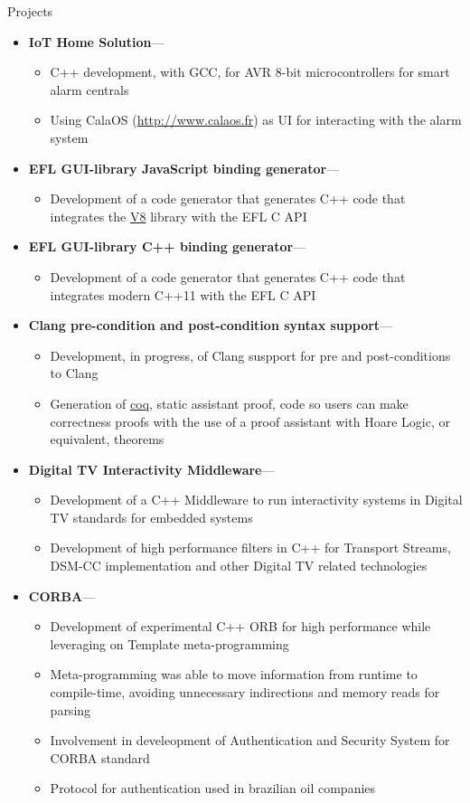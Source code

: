 \documentclass[10pt,oneside]{article}
\newenvironment{ressection}[1]{
	\vspace{4pt}
	{\fontfamily{phv}\selectfont\Large#1}
	\begin{itemize}
	\vspace{3pt}
}{
	\end{itemize}
}
\newcommand{\ressubitem}[1]{
	\vspace{-1pt}
	\item \begin{flushleft} #1 \end{flushleft}
}
\newcommand{\resonelinebigitem}[2]{
	\vspace{-5pt}
	\item
	\textbf{#1}---#2
}
\newenvironment{resonelinesubsec}[2]{
	\resonelinebigitem{#1}{#2}
	\vspace{-2pt}
	\begin{itemize}
}{
	\end{itemize}
}
\begin{document}
\begin{ressection}{Projects}

  \begin{resonelinesubsec}{IoT Home Solution}{}
    \ressubitem{C++ development, with GCC, for AVR 8-bit
    microcontrollers for smart alarm centrals}
    \ressubitem{Using CalaOS (\url{http://www.calaos.fr}) as UI for interacting with the alarm system}
  \end{resonelinesubsec}

  \begin{resonelinesubsec}{EFL GUI-library JavaScript binding generator}{}
    \ressubitem{Development of a code generator that generates C++
      code that integrates the
      \href{https://developers.google.com/v8/}{V8} library with the
      EFL C API}
  \end{resonelinesubsec}

  \begin{resonelinesubsec}{EFL GUI-library C++ binding generator}{}
    \ressubitem{Development of a code generator that generates C++
      code that integrates modern C++11 with the
      EFL C API}
  \end{resonelinesubsec}
  \newpage
  \begin{resonelinesubsec}{Clang pre-condition and post-condition
      syntax support}{}
    \ressubitem{Development, in progress, of Clang suspport for pre
      and post-conditions to Clang}
    \ressubitem{Generation of \href{https://coq.inria.fr/}{coq},
      static assistant proof, code so users can make correctness
      proofs with the use of a proof assistant with Hoare Logic, or
      equivalent, theorems}
  \end{resonelinesubsec}

  \begin{resonelinesubsec}{Digital TV Interactivity Middleware}{}
    \ressubitem{Development of a C++ Middleware to run interactivity
      systems in Digital TV standards for embedded systems}
    \ressubitem{Development of high performance filters in C++ for
      Transport Streams, DSM-CC implementation and other Digital TV
      related technologies}
  \end{resonelinesubsec}

  \begin{resonelinesubsec}{CORBA}{}
    \ressubitem{Development of experimental C++ ORB for high
      performance while leveraging on Template meta-programming}
    \ressubitem{Meta-programming was able to move information from runtime to compile-time, avoiding unnecessary
      indirections and memory reads for parsing}
    \ressubitem{Involvement in develeopment of Authentication and
      Security System for CORBA standard}
    \ressubitem{Protocol for authentication used in brazilian oil companies}
  \end{resonelinesubsec}


\end{ressection}
\end{document}
